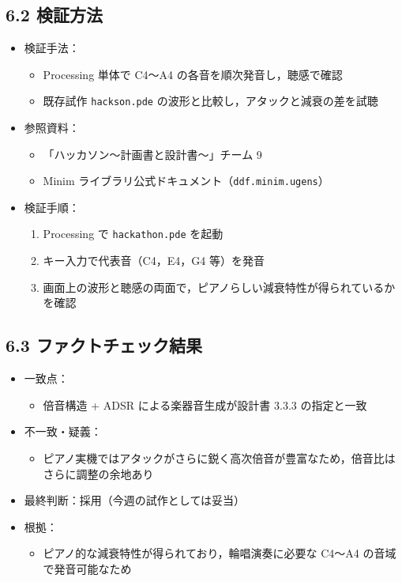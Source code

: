 \documentclass[a4paper,11pt]{ltjsarticle}
\providecommand{\％}{\%}
\begin{document}
\subsection*{6.2 検証方法}

\begin{itemize}
    \item 検証手法：
    \begin{itemize}
        \item Processing 単体で C4〜A4 の各音を順次発音し，聴感で確認
        \item 既存試作 \texttt{hackson.pde} の波形と比較し，アタックと減衰の差を試聴
    \end{itemize}
    \item 参照資料：
    \begin{itemize}
        \item 「ハッカソン～計画書と設計書～」チーム 9
        \item Minim ライブラリ公式ドキュメント（\texttt{ddf.minim.ugens}）
    \end{itemize}
    \item 検証手順：
    \begin{enumerate}
        \item Processing で \texttt{hackathon.pde} を起動
        \item キー入力で代表音（C4，E4，G4 等）を発音
        \item 画面上の波形と聴感の両面で，ピアノらしい減衰特性が得られているかを確認
    \end{enumerate}
\end{itemize}

\subsection*{6.3 ファクトチェック結果}

\begin{itemize}
    \item 一致点：
    \begin{itemize}
        \item 倍音構造 + ADSR による楽器音生成が設計書 3.3.3 の指定と一致
    \end{itemize}
    \item 不一致・疑義：
    \begin{itemize}
        \item ピアノ実機ではアタックがさらに鋭く高次倍音が豊富なため，倍音比はさらに調整の余地あり
    \end{itemize}
    \item 最終判断：採用（今週の試作としては妥当）
    \item 根拠：
    \begin{itemize}
        \item ピアノ的な減衰特性が得られており，輪唱演奏に必要な C4〜A4 の音域で発音可能なため
    \end{itemize}
\end{itemize}
\end{document}
